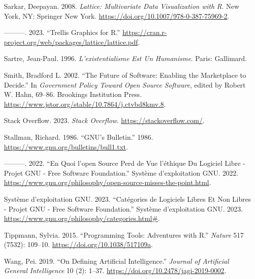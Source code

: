 \documentclass[
  letterpaper,
]{scrbook}
\newlength{\cslhangindent}
\newlength{\cslentryspacingunit} %
\newenvironment{CSLReferences}[2] %
 {%
  \setlength{\parindent}{0pt}
  \ifodd #1
  \let\oldpar\par
  \def\par{\hangindent=\cslhangindent\oldpar}
  \fi
  \setlength{\parskip}{#2\cslentryspacingunit}
 }%
 {}
\begin{document}
\begin{CSLReferences}{1}{0}
\leavevmode{}%
Sarkar, Deepayan. 2008. \emph{Lattice: {Multivariate Data Visualization}
with {R}}. New York, NY: Springer New York.
\url{https://doi.org/10.1007/978-0-387-75969-2}.

\leavevmode{}%
---------. 2023. {``Trellis {Graphics} for {R}.''}
\url{https://cran.r-project.org/web/packages/lattice/lattice.pdf}.

\leavevmode{}%
Sartre, Jean-Paul. 1996. \emph{L'existentialisme Est Un Humanisme}.
Paris: Gallimard.

\leavevmode{}%
Smith, Bradford L. 2002. {``The {Future} of {Software}: {Enabling} the
{Marketplace} to {Decide}.''} In \emph{Government {Policy} Toward {Open
Source Software}}, edited by Robert W. Hahn, 69--86. Brookings
Institution Press.
\url{https://www.jstor.org/stable/10.7864/j.ctvbd8kmv.8}.

\leavevmode{}%
Stack Overflow. 2023. \emph{Stack {Overflow}}.
\url{https://stackoverflow.com/}.

\leavevmode{}%
Stallman, Richard. 1986. {``{GNU}'s {Bulletin}.''} 1986.
\url{https://www.gnu.org/bulletins/bull1.txt}.

\leavevmode{}%
---------. 2022. {``En Quoi l'open Source Perd de Vue l'éthique Du
Logiciel Libre - {Projet GNU} - {Free Software Foundation}.''} Système
d'exploitation GNU. 2022.
\url{https://www.gnu.org/philosophy/open-source-misses-the-point.html}.

\leavevmode{}%
Système d'exploitation GNU. 2023. {``Catégories de Logiciels Libres Et
Non Libres - {Projet GNU} - {Free Software Foundation}.''} Système
d'exploitation GNU. 2023.
\url{https://www.gnu.org/philosophy/categories.html\#}.

\leavevmode{}%
Tippmann, Sylvia. 2015. {``Programming Tools: {Adventures} with {R}.''}
\emph{Nature} 517 (7532): 109--10.
\url{https://doi.org/10.1038/517109a}.

\leavevmode{}%
Wang, Pei. 2019. {``On {Defining Artificial Intelligence}.''}
\emph{Journal of Artificial General Intelligence} 10 (2): 1--37.
\url{https://doi.org/10.2478/jagi-2019-0002}.


\end{CSLReferences}
\end{document}
